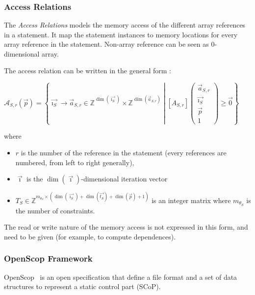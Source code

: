 \documentclass[paper=a4, fontsize=11pt]{scrartcl}
\numberwithin{equation}{section}        %
\numberwithin{figure}{section}          %
\numberwithin{table}{section}               %
\begin{document}
            \subsubsection{Access Relations}
                The \textit{Access Relations} models the memory access of the different
                array references in a statement. It map the statement instances to memory locations
                for every array reference in the statement. Non-array reference can be seen as
                0-dimensional array.

                The access relation can be written in the general form :
                \begin{center}
                    $\mathcal{A}_{S,r}(\vec{p}) = 
                    \left\{
                        \vec{\imath_S} \to \vec{a}_{S,r} \in \mathbb{Z}^{\dim(\vec{\imath_S})}\times\mathbb{Z}^{\dim(\vec{a}_{S,r})}
                        \middle|
                        \left[A_{S,r}\right]\left(\begin{array}{c}\vec{a}_{S,r}\\\vec{\imath_S}\\\vec{p}\\1\end{array}\right)
                        \geq \vec{0}
                    \right\}$
                \end{center}
                where 
                \begin{itemize}
                    \item $r$ is the number of the reference in the statement (every references are
                        numbered, from left to right generally),
                    \item $\vec{\imath}$ is the $\dim(\vec{\imath})$-dimensional iteration vector
                    \item $T_S \in \mathbb{Z}^{m_{\theta_S}\times(\dim(\vec{\imath_S})+\dim(\vec{t_S})+\dim(\vec{p})+1)}$
                        is an integer matrix where $m_{\theta_S}$ is the number of constraints.
                \end{itemize}

                The read or write nature of the memory access is not expressed in this form,
                and need to be given (for example, to compute dependences).

            \subsubsection{OpenScop Framework}
                OpenScop~\cite{openscop} is an open specification that define a file format
                and a set of data structures to represent a static control part (SCoP).
\end{document}
